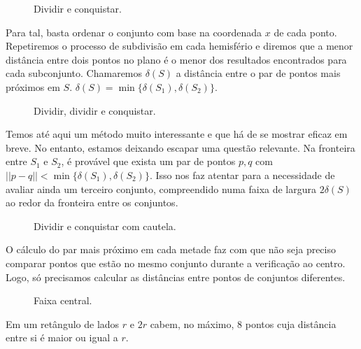 \documentclass{homework}
\begin{document}
	\begin{figure}[H]
		\centering
		
		\caption{Dividir e conquistar.}
		\label{fig:3.1}
	\end{figure}
	
	Para tal, basta ordenar o conjunto com base na coordenada $x$ de cada ponto. Repetiremos o processo de subdivisão em cada hemisfério e diremos que a menor distância entre dois pontos no plano é o menor dos resultados encontrados para cada subconjunto. Chamaremos $\delta(S)$ a distância entre o par de pontos mais próximos em $S$. $\delta(S) = \min\{\delta(S_1), \delta(S_2)\}$. \par
	
	\begin{figure}[H]
		\centering
		
		\caption{Dividir, dividir e conquistar.}
		\label{fig:3.2}
	\end{figure}
	
	Temos até aqui um método muito interessante e que há de se mostrar eficaz em breve. No entanto, estamos deixando escapar uma questão relevante. Na fronteira entre $S_1$ e $S_2$, é provável que exista um par de pontos $p, q$ com $||p - q|| < \min\{\delta(S_1), \delta(S_2)\}$. Isso nos faz atentar para a necessidade de avaliar ainda um terceiro conjunto, compreendido numa faixa de largura $2 \delta(S)$ ao redor da fronteira entre os conjuntos.\par
	
	\begin{figure}[H]
		\centering
		
		\caption{Dividir e conquistar com cautela.}
		\label{fig:3.3}
	\end{figure}
	
	O cálculo do par mais próximo em cada metade faz com que não seja preciso comparar pontos que estão no mesmo conjunto durante a verificação ao centro. Logo, só precisamos calcular as distâncias entre pontos de conjuntos diferentes.
	
	\begin{figure}[H]
		\centering
		
		\caption{Faixa central.}
		\label{fig:3.4}
	\end{figure}
	
	\begin{theorem}
		Em um retângulo de lados $r$ e $2r$ cabem, no máximo, $8$ pontos cuja distância entre si é maior ou igual a $r$.
	\end{theorem}
\end{document}
